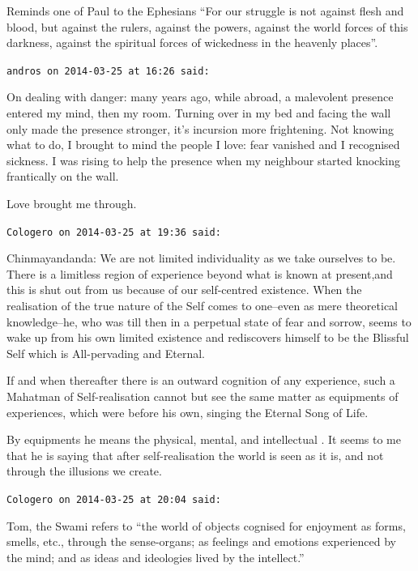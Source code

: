 \begin{footnotesize}
\begin{sffamily}
Reminds one of Paul to the Ephesians ``For our struggle is not against flesh and blood, but against the rulers, against the powers, against the world forces of this darkness, against the spiritual forces of wickedness in the heavenly places''.

\hfill

\texttt{andros on 2014-03-25 at 16:26 said:}

On dealing with danger: many years ago, while abroad, a malevolent presence entered my mind, then my room. Turning over in my bed and facing the wall only made the presence stronger, it's incursion more frightening. Not knowing what to do, I brought to mind the people I love: fear vanished and I recognised sickness. I was rising to help the presence when my neighbour started knocking frantically on the wall.

Love brought me through.

\hfill

\texttt{Cologero on 2014-03-25 at 19:36 said:}

\begin{quotationx}\footnotesize

Chinmayandanda: We are not limited individuality as we take ourselves to be. There is a limitless region of experience beyond what is known at present,and this is shut out from us because of our self-centred existence. When the realisation of the true nature of the Self comes to one--even as mere theoretical knowledge--he, who was till then in a perpetual state of fear and sorrow, seems to wake up from his own limited existence and rediscovers himself to be the Blissful Self which is All-pervading and Eternal.

If and when thereafter there is an outward cognition of any experience, such a Mahatman of Self-realisation cannot but see the same matter as equipments of experiences, which were before his own, singing the Eternal Song of Life.
\end{quotationx}


By equipments he means the physical, mental, and intellectual . It seems to me that he is saying that after self-realisation the world is seen as it is, and not through the illusions we create.

\hfill

\texttt{Cologero on 2014-03-25 at 20:04 said:}

Tom, the Swami refers to ``the world of objects cognised for enjoyment as forms, smells, etc., through the sense-organs; as feelings and emotions experienced by the mind; and as ideas and ideologies lived by the intellect.''


\end{sffamily}
\end{footnotesize}
